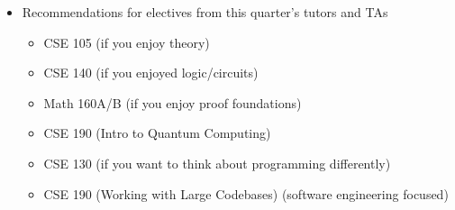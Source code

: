 \begin{itemize}
\begin{itemize}
\item Take into account the distances between classes if they are back to back
\end{itemize} 
\item Recommendations for electives from this quarter's tutors and TAs
\begin{itemize}
\item CSE 105 (if you enjoy theory)
\item CSE 140 (if you enjoyed logic/circuits)
\item Math 160A/B (if you enjoy proof foundations)
\item CSE 190 (Intro to Quantum Computing)
\item CSE 130 (if you want to think about programming differently)
\item CSE 190 (Working with Large Codebases) (software engineering focused)
\end{itemize}
\end{itemize}

